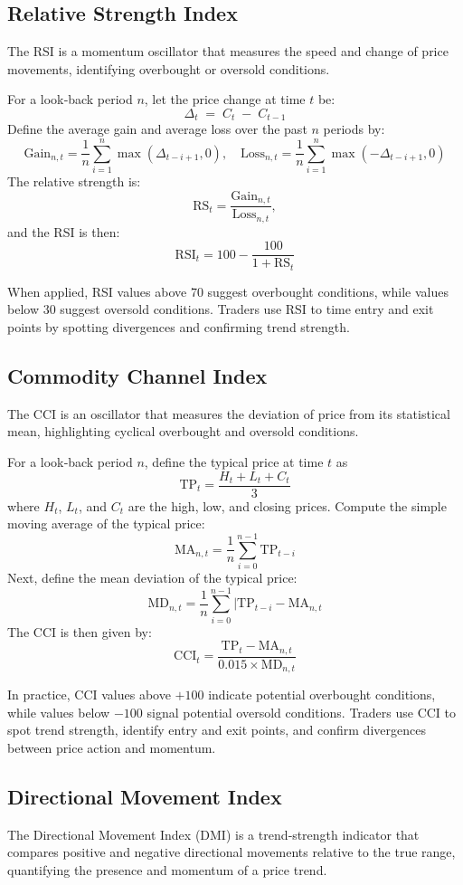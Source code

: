 \subsection{Relative Strength Index}
The \gls{RSI} is a momentum oscillator that measures the speed and change of price movements, identifying overbought or oversold conditions.

For a look‐back period \(n\), let the price change at time \(t\) be:
\[\Delta_t \;=\; C_t \;-\; C_{t-1}\]
Define the average gain and average loss over the past \(n\) periods by:
\[\mathrm{Gain}_{n,t} = \frac{1}{n} \sum_{i=1}^{n} \max(\Delta_{t-i+1},0), \quad \mathrm{Loss}_{n,t} = \frac{1}{n} \sum_{i=1}^{n} \max(-\Delta_{t-i+1},0)\]
The relative strength is:
\[\mathrm{RS}_t = \frac{\mathrm{Gain}_{n,t}}{\mathrm{Loss}_{n,t}},\]
and the RSI is then:
\[\mathrm{RSI}_t = 100 - \frac{100}{1 + \mathrm{RS}_t}\]

When applied, \gls{RSI} values above 70 suggest overbought conditions, while values below 30 suggest oversold conditions. Traders use \gls{RSI} to time entry and exit points by spotting divergences and confirming trend strength.

\subsection{Commodity Channel Index}
The \gls{CCI} is an oscillator that measures the deviation of price from its statistical mean, highlighting cyclical overbought and oversold conditions.

For a look‐back period \(n\), define the typical price at time \(t\) as
\[\mathrm{TP}_t = \frac{H_t + L_t + C_t}{3}\]
where \(H_t\), \(L_t\), and \(C_t\) are the high, low, and closing prices.  Compute the simple moving average of the typical price:
\[\mathrm{MA}_{n,t} = \frac{1}{n} \sum_{i=0}^{n-1} \mathrm{TP}_{t-i}\]
Next, define the mean deviation of the typical price:
\[\mathrm{MD}_{n,t} = \frac{1}{n} \sum_{i=0}^{n-1} |\mathrm{TP}_{t-i} - \mathrm{MA}_{n,t}\]
The CCI is then given by:
\[\mathrm{CCI}_t = \frac{\mathrm{TP}_t - \mathrm{MA}_{n,t}}{0.015 \times \mathrm{MD}_{n,t}}\]

In practice, \gls{CCI} values above \(+100\) indicate potential overbought conditions, while values below \(-100\) signal potential oversold conditions. Traders use \gls{CCI} to spot trend strength, identify entry and exit points, and confirm divergences between price action and momentum.

\subsection{Directional Movement Index}
The Directional Movement Index (DMI) is a trend‐strength indicator that compares positive and negative directional movements relative to the true range, quantifying the presence and momentum of a price trend.

